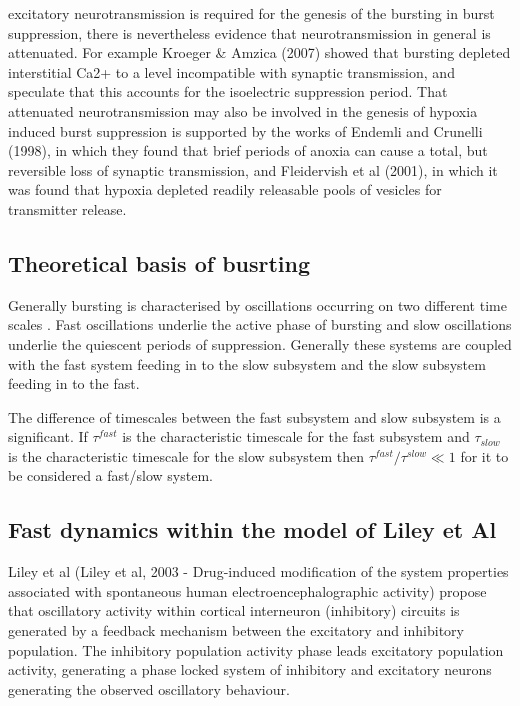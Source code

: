 \documentclass[a4paper,12pt]{article}
\begin{document}
excitatory neurotransmission is required for the genesis of the bursting
in burst suppression, there is nevertheless evidence that
neurotransmission in general is attenuated. For example Kroeger \&
Amzica (2007) showed that bursting depleted interstitial Ca2+ to a
level incompatible with synaptic transmission, and speculate that this
accounts for the isoelectric suppression period. That attenuated
neurotransmission may also be involved in the genesis of hypoxia
induced burst suppression is supported by the works of Endemli and
Crunelli (1998), in which they found that brief periods of anoxia can
cause a total, but reversible loss of synaptic transmission, and
Fleidervish et al (2001), in which it was found that hypoxia depleted
readily releasable pools of vesicles for transmitter release.

\subsection{Theoretical basis of busrting}
Generally bursting is characterised by oscillations occurring on two different time scales \cite{izikevich2007_1}. Fast
oscillations underlie the active phase of bursting and slow oscillations underlie the quiescent periods of suppression. Generally these systems are coupled with the fast system feeding in to the slow subsystem and the slow subsystem feeding in to the fast.

The difference of timescales between the fast subsystem and slow subsystem is a significant. If $\tau^{fast}$ is the characteristic timescale for the fast subsystem and $\tau_{slow}$ is the characteristic timescale for the slow subsystem then $\tau^{fast}/\tau^{slow} \ll 1$ for it to be considered a fast/slow system.

\subsection{Fast dynamics within the model of Liley et Al}
Liley et al (Liley et al, 2003 - Drug-induced modification of the system properties associated
with spontaneous human electroencephalographic activity) propose that oscillatory activity within cortical interneuron
(inhibitory) circuits is generated by a feedback mechanism between the excitatory and inhibitory population.
The inhibitory population activity phase leads excitatory population activity, generating a phase locked system of
inhibitory and excitatory neurons generating the observed oscillatory behaviour.
\end{document}
